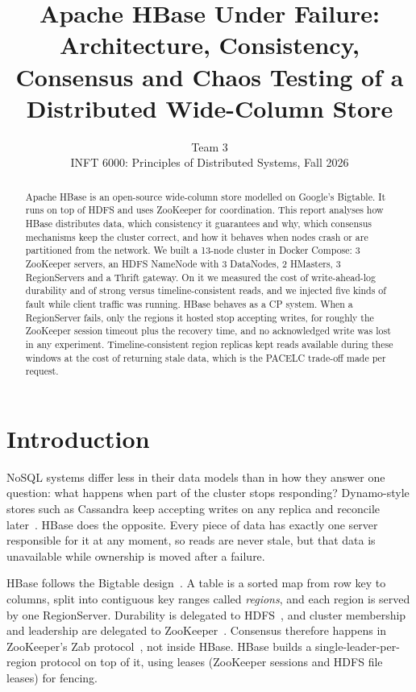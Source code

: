 \documentclass[10pt,twocolumn,letterpaper]{article}
\title{\Large\bfseries Apache HBase Under Failure: Architecture, Consistency,\\Consensus and Chaos Testing of a Distributed Wide-Column Store}
\author{Team 3 \\ INFT 6000: Principles of Distributed Systems, Fall 2026}
\date{}
\begin{document}
\maketitle

\begin{abstract}
Apache HBase is an open-source wide-column store modelled on Google's Bigtable. It runs on top of HDFS and uses ZooKeeper for coordination. This report analyses how HBase distributes data, which consistency it guarantees and why, which consensus mechanisms keep the cluster correct, and how it behaves when nodes crash or are partitioned from the network. We built a 13-node cluster in Docker Compose: 3 ZooKeeper servers, an HDFS NameNode with 3 DataNodes, 2 HMasters, 3 RegionServers and a Thrift gateway. On it we measured the cost of write-ahead-log durability and of strong versus timeline-consistent reads, and we injected five kinds of fault while client traffic was running. HBase behaves as a CP system. When a RegionServer fails, only the regions it hosted stop accepting writes, for roughly the ZooKeeper session timeout plus the recovery time, and no acknowledged write was lost in any experiment. Timeline-consistent region replicas kept reads available during these windows at the cost of returning stale data, which is the PACELC trade-off made per request.
\end{abstract}

\section{Introduction}
NoSQL systems differ less in their data models than in how they answer one question: what happens when part of the cluster stops responding? Dynamo-style stores such as Cassandra keep accepting writes on any replica and reconcile later~\cite{dynamo}. HBase does the opposite. Every piece of data has exactly one server responsible for it at any moment, so reads are never stale, but that data is unavailable while ownership is moved after a failure.

HBase follows the Bigtable design~\cite{bigtable}. A table is a sorted map from row key to columns, split into contiguous key ranges called \emph{regions}, and each region is served by one RegionServer. Durability is delegated to HDFS~\cite{hdfs}, and cluster membership and leadership are delegated to ZooKeeper~\cite{zookeeper}. Consensus therefore happens in ZooKeeper's Zab protocol~\cite{zab}, not inside HBase. HBase builds a single-leader-per-region protocol on top of it, using leases (ZooKeeper sessions and HDFS file leases) for fencing.
\end{document}
